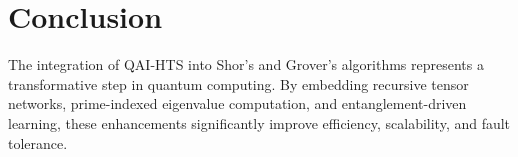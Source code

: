 \documentclass[12pt]{article}
\begin{document}
\section{Conclusion}
The integration of QAI-HTS into Shor’s and Grover’s algorithms represents a transformative step in quantum computing. By embedding recursive tensor networks, prime-indexed eigenvalue computation, and entanglement-driven learning, these enhancements significantly improve efficiency, scalability, and fault tolerance.
\end{document}
